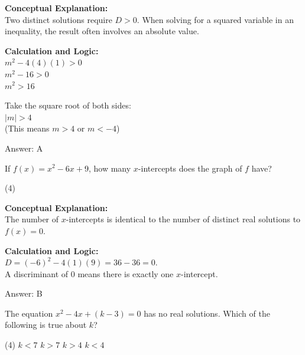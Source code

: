 \documentclass[11pt,paper=a4,answers]{exam}
\begin{document}
\begin{questions}
\begin{solution}
\textbf{Conceptual Explanation:} \\
Two distinct solutions require $D > 0$. When solving for a squared variable in an inequality, the result often involves an absolute value.

\vspace{20pt}

\textbf{Calculation and Logic:} \\
$m^2 - 4(4)(1) > 0$ \\
$m^2 - 16 > 0$ \\
$m^2 > 16$

\vspace{10pt}

Take the square root of both sides: \\
$|m| > 4$ \\
(This means $m > 4$ or $m < -4$)

\vspace{25pt}

Answer: \colorbox{yellow!100}{A}
\end{solution}

\vspace{40pt}

\question
If $f(x) = x^2 - 6x + 9$, how many $x$-intercepts does the graph of $f$ have?
\begin{tasks}(4)
\end{tasks}

\begin{solution}
\textbf{Conceptual Explanation:} \\
The number of $x$-intercepts is identical to the number of distinct real solutions to $f(x) = 0$.

\vspace{20pt}

\textbf{Calculation and Logic:} \\
$D = (-6)^2 - 4(1)(9) = 36 - 36 = 0$. \\
A discriminant of 0 means there is exactly one $x$-intercept.

\vspace{25pt}

Answer: \colorbox{yellow!100}{B}
\end{solution}

\vspace{40pt}

\question
The equation $x^2 - 4x + (k - 3) = 0$ has no real solutions. Which of the following is true about $k$?
\begin{tasks}(4)
    \task $k < 7$
    \task $k > 7$
    \task $k > 4$
    \task $k < 4$
\end{tasks}


\end{questions}
\end{document}
